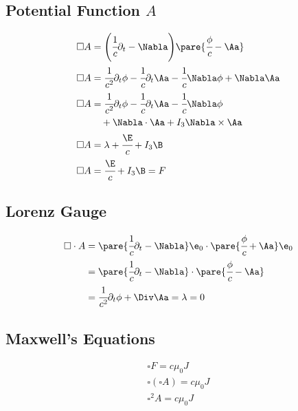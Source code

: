 \subsection{Potential Function $A$}

  \begin{align}
    \square A &= \Bigg(\cfrac{1}{c}\partial_t - \Nabla\Bigg)\pare{\cfrac{\phi}{c}-\Aa} \\
    \square A &= \cfrac{1}{c^2}\partial_t\phi - \cfrac{1}{c}\partial_t\Aa \nonumber - \cfrac{1}{c}\Nabla\phi + \Nabla\Aa \\
    \square A & = \cfrac{1}{c^2}\partial_t\phi - \cfrac{1}{c}\partial_t\Aa- \cfrac{1}{c}\Nabla\phi \nonumber \\
    &\quad + \Nabla\cdot\Aa + I_3\Nabla\times\Aa \\
    \square A &= \lambda + \cfrac{\E}{c} + I_3\B \\
    \square A &= \cfrac{\E}{c} + I_3\B = F
  \end{align}

\subsection{Lorenz Gauge}
  \begin{align}
    \square\cdot A &= \pare{\cfrac{1}{c}\partial_t - \Nabla}\e_0\cdot \pare{\cfrac{\phi}{c} + \Aa}\e_0 \\
    &= \pare{\cfrac{1}{c}\partial_t - \Nabla}\cdot \pare{\cfrac{\phi}{c} - \Aa}\\
    &=\cfrac{1}{c^2}\partial_t\phi + \Div \Aa = \lambda = 0
  \end{align}

\subsection{Maxwell's Equations}
  \begin{align}
    \square F = c\mu_0 J \\
    \square (\square A) = c\mu_0 J \\
    \square^2 A = c\mu_0 J
  \end{align}
